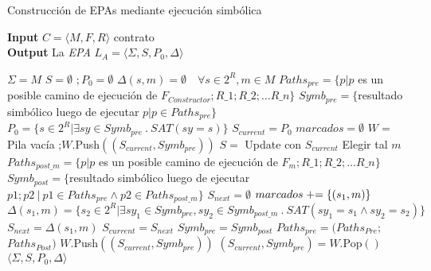 \begin{algorithm}[H]
\captionsetup{belowskip=0pt}
\caption{Construcción de EPAs mediante ejecución simbólica}
 \hspace*{\algorithmicindent} \textbf{Input} $C = \langle M, F, R \rangle$ contrato \\
 \hspace*{\algorithmicindent} \textbf{Output} La \textit{EPA} $L_A =\langle \Sigma, S, P_0, \Delta \rangle$
 \begin{algorithmic}[1]
\State $\Sigma = M$
\State $S = \emptyset$ $;P_0 = \emptyset$
\State $\Delta(s,m) = \emptyset \quad \forall s \in 2^R, m \in M$
\State $Paths_{pre} = \{p | p$ es un posible camino de ejecución de $F_{Constructor};R\_1;R\_2; \dots R\_n\}$
\State $Symb_{pre} = \{$resultado simbólico luego de ejecutar $p | p \in Paths_{pre} \}$ 
\State $P_0 = \{s \in 2^R | \exists sy \in Symb_{pre} \: . \: SAT(sy= s)\}$
\State $S_{current } = P_0$
\State $marcados = \emptyset$
\State $W =$ Pila vacía ;$W.$Push$((S_{current},Symb_{pre}))$
    \State $S =$ Update con $S_{current }$
        \State Elegir tal $m$
        \State $Paths_{post\_m} = \{p | p$ es un posible camino de ejecución de $F_m;R\_1;R\_2; \dots R\_n\}$
        \State $Symb_{post} = \{$resultado simbólico luego de ejecutar $p1;p2 \:|\: p1 \in Paths_{pre} \land p2 \in Paths_{post\_m} \} $
        \State $S_{next} = \emptyset$
            \State $marcados \mathrel{+}= \{(s_1,m)\}$
            \State  $\Delta(s_1,m) = \{s_2 \in 2^R | \exists sy_1 \in Symb_{pre}, sy_2 \in Symb_{post\_m} \: . \: SAT(sy_1= s_1 \land sy_2 = s_2)\}$ 
            \State $S_{next} = \Delta(s_1,m)$
        \EndFor
        \State $S_{current } = S_{next}$
        \State $Symb_{pre} = Symb_{post}$
        \State $Paths_{pre} = (Paths_{Pre};$ $Paths_{Post})$ 
        \State $W.$Push$((S_{current },Symb_{pre}))$
    \Else
        \State $(S_{current },Symb_{pre}) = W.$Pop$()$
    \EndIf
\EndWhile
\State \Return $\langle \Sigma, S, P_0, \Delta \rangle$
\end{algorithmic}
\end{algorithm}